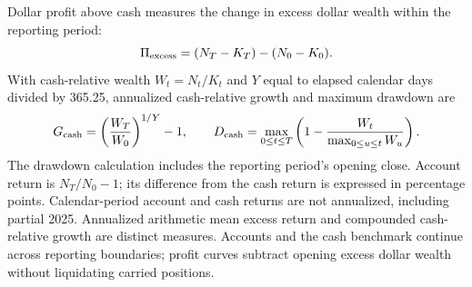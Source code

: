 Dollar profit above cash measures the change in excess dollar wealth within the reporting period:
\begin{equation*}
\Pi_{\rm excess}=(N_T-K_T)-(N_0-K_0).
\end{equation*}
With cash-relative wealth \(W_t=N_t/K_t\) and \(Y\) equal to elapsed calendar days divided by 365.25, annualized cash-relative growth and maximum drawdown are
\begin{equation*}
G_{\rm cash}=\left(\frac{W_T}{W_0}\right)^{1/Y}-1,\qquad
D_{\rm cash}=\max_{0\leq t\leq T}
\left(1-\frac{W_t}{\max_{0\leq u\leq t}W_u}\right).
\end{equation*}
The drawdown calculation includes the reporting period's opening close. Account return is \(N_T/N_0-1\); its difference from the cash return is expressed in percentage points. Calendar-period account and cash returns are not annualized, including partial 2025. Annualized arithmetic mean excess return and compounded cash-relative growth are distinct measures. Accounts and the cash benchmark continue across reporting boundaries; profit curves subtract opening excess dollar wealth without liquidating carried positions.


\FloatBarrier

